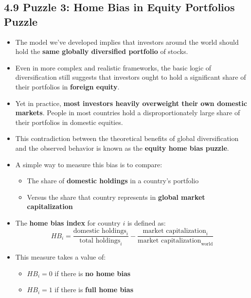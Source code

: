 \documentclass[12pt]{article}
\begin{document}
\begin{itemize}
\section*{\noindent\textbf{4.9 Puzzle 3: Home Bias in Equity Portfolios Puzzle
}}

\begin{itemize}
    \item The model we’ve developed implies that investors around the world should hold the \textbf{same globally diversified portfolio} of stocks.

    \item Even in more complex and realistic frameworks, the basic logic of diversification still suggests that investors ought to hold a significant share of their portfolios in \textbf{foreign equity}.

    \item Yet in practice, \textbf{most investors heavily overweight their own domestic markets}. People in most countries hold a disproportionately large share of their portfolios in domestic equities.

    \item This contradiction between the theoretical benefits of global diversification and the observed behavior is known as the \textbf{equity home bias puzzle}.

    \item A simple way to measure this bias is to compare:
    \begin{itemize}
        \item The share of \textbf{domestic holdings} in a country's portfolio
        \item Versus the share that country represents in \textbf{global market capitalization}
    \end{itemize}

    \item The \textbf{home bias index} for country \( i \) is defined as:
    \[
    HB_i = \frac{\text{domestic holdings}_i}{\text{total holdings}_i} 
    - \frac{\text{market capitalization}_i}{\text{market capitalization}_{\text{world}}}
    \]

    \item This measure takes a value of:
    \begin{itemize}
        \item \( HB_i = 0 \) if there is \textbf{no home bias}
        \item \( HB_i = 1 \) if there is \textbf{full home bias}
    \end{itemize}


\end{itemize}
\end{itemize}
\end{document}
